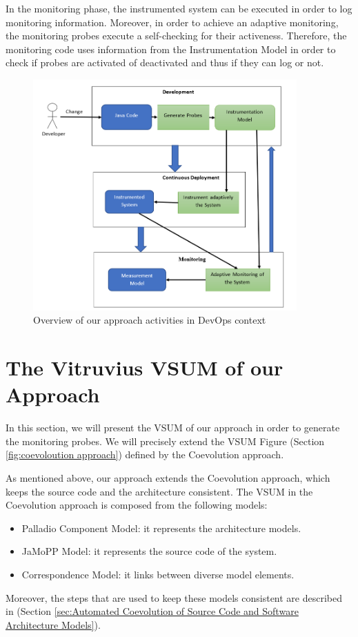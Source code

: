 In the monitoring phase, the instrumented system can be executed in order to log monitoring information. Moreover, in order to achieve an adaptive monitoring, the monitoring probes execute a self-checking for their activeness. Therefore, the monitoring code uses information from the Instrumentation Model in order to check if probes are activated of deactivated and thus if they can log or not. 


\begin{figure}[h]
\centering
\includegraphics[width=0.9\textwidth]{figures/devops_approach}
\caption{Overview of our approach activities in DevOps context}
\label{fig:devops_approach}
\end{figure}


\section{The Vitruvius VSUM of our Approach}
\label{sec:The Vitruvius VSUM of our approach}

In this section, we will present the VSUM of our approach in order to generate the monitoring probes. We will precisely extend the VSUM Figure (Section \ref{fig:coevoloution approach}) defined by the Coevolution approach.

As mentioned above, our approach extends the Coevolution approach, which keeps the source code and the architecture consistent. The VSUM in the Coevolution approach is composed from the following models:
\begin{itemize}
\item Palladio Component Model: it represents the architecture models.
\item JaMoPP Model: it represents the source code of the system.
\item Correspondence Model: it links between diverse model elements.
\end{itemize}
Moreover, the steps that are used to keep these models consistent are described in (Section \ref{sec:Automated Coevolution of Source Code and Software Architecture Models}). 


